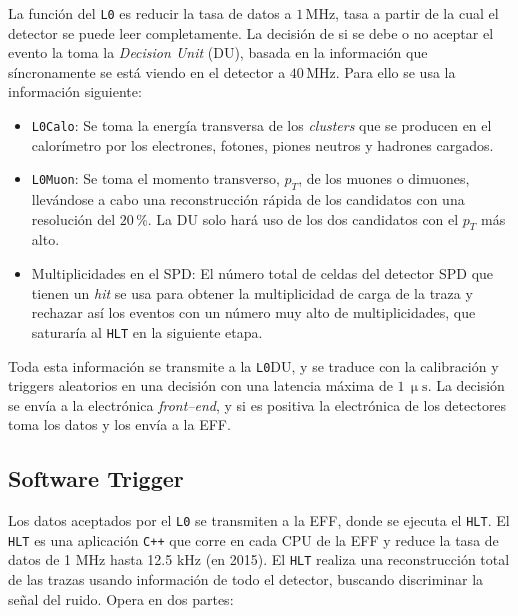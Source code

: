 La función del \texttt{L0} es reducir la tasa de datos a $1\,\mathrm{MHz}$, tasa a partir de la cual el detector se puede leer completamente. La decisión de si se debe o no aceptar el evento la toma la \textit{Decision Unit} (DU), basada en la información que síncronamente se está viendo en el detector a $40\,\mathrm{MHz}$. Para ello se usa la información siguiente:
\begin{itemize}
  \item \texttt{L0Calo}: Se toma la energía transversa de los \textit{clusters} que se producen en el calorímetro por los electrones, fotones, piones neutros y hadrones cargados. %
  \item \texttt{L0Muon}:  Se toma el momento transverso, $p_T$, de los muones o dimuones, llevándose a cabo una reconstrucción rápida de los candidatos con una resolución del $20 \, \%$. La DU solo hará uso de los dos candidatos con el $p_T$ más alto.
  \item Multiplicidades en el SPD: El número total de celdas del detector SPD que tienen un \textit{hit} se usa para obtener la multiplicidad de carga de la traza y rechazar así los eventos con un número muy alto de multiplicidades, que saturaría al \texttt{HLT} en la siguiente etapa.
\end{itemize}
%
Toda esta información se transmite a la \texttt{L0}DU, y se traduce con la calibración y triggers aleatorios en una decisión con una latencia máxima de $1 \, \mathrm{\upmu s}$. La decisión se envía a la electrónica \emph{front--end}, y si es positiva la electrónica de los detectores toma los datos y los envía a la EFF.



\subsection{Software Trigger} %
\label{sec_hltrigger}

Los datos aceptados por el \texttt{L0} se transmiten a la EFF, donde se ejecuta el \texttt{HLT}. El \texttt{HLT} es una aplicación \texttt{C++} que corre en cada CPU de la EFF y reduce la tasa de datos de 1 MHz hasta 12.5 kHz (en 2015). El \texttt{HLT} realiza una reconstrucción total de las trazas usando información \color{vero} de \color{norm} todo el detector, buscando discriminar la señal del ruido. \color{vero} Opera en dos \color{norm} partes:

